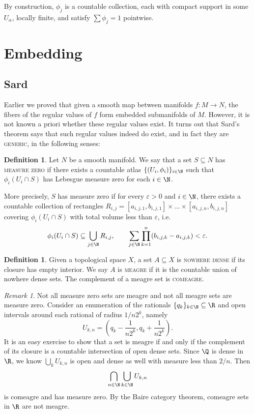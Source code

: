\documentclass[reqno]{amsart}
\theoremstyle{definition}
\newtheorem{definition}[theorem]{Definition}
\theoremstyle{remark}
\newtheorem*{remark}{Remark}
\renewcommand{\epsilon}{\varepsilon}
\renewcommand{\emph}{\textsc}
\begin{document}
	By construction, $\phi_j$ is a countable collection, each with compact support in some $U_\alpha$, locally finite, and satisfy $\sum \phi_j = 1$ pointwise. 	


\section{Embedding}

\subsection{Sard}

Earlier we proved that given a smooth map between manifolds $f: M \to N$, the fibers of the regular values of $f$ form embedded submanifolds of $M$. However, it is not known a priori whether these regular values exist. It turns out that Sard's theorem says that such regular values indeed do exist, and in fact they are \emph{generic}, in the following senses:

\begin{definition}
	Let $N$ be a smooth manifold. We say that a set $S \subseteq N$ has \emph{measure zero} if there exists a countable atlas $\{ (U_i, \phi_i) \}_{i \in \N}$ such that $\phi_i (U_i \cap S)$ has Lebesgue measure zero for each $i \in \N$. 
	
	More precisely, $S$ has measure zero if for every $\epsilon > 0$ and $i \in \N$, there exists a countable collection of rectangles $R_{i, j} = [a_{i, j, 1}, b_{i, j, 1}] \times \dots \times [a_{i, j, n}, b_{i, j, n}]$ covering $\phi_i (U_i \cap S)$ with total volume less than $\epsilon$, i.e.
		\[ \phi_i (U_i \cap S) \subseteq \bigcup_{j \in \N} R_{i, j}, \qquad \sum_{j \in \N} \prod_{k = 1}^n (b_{i, j, k} - a_{i, j, k}) < \epsilon. \]
\end{definition}

\begin{definition}
	Given a topological space $X$, a set $A \subseteq X$ is \emph{nowhere dense} if its closure has empty interior. We say $A$ is \emph{meagre} if it is the countable union of nowhere dense sets. The complement of a meagre set is \emph{comeagre}.
\end{definition}

\begin{remark}
	Not all measure zero sets are meagre and not all meagre sets are measure zero. Consider an enumeration of the rationals $\{q_k\}_{k \in \N} \subseteq \R$ and open intervals around each rational of radius $1/n2^k$, namely
		\[ U_{k, n} = \left( q_k - \frac{1}{n 2^k},  q_k + \frac{1}{n 2^k} \right). \]
	It is an easy exercise to show that a set is meagre if and only if the complement of its closure is a countable intersection of open dense sets. Since $\Q$ is dense in $\R$, we know $\bigcup_k U_{k, n}$ is open and dense as well with measure less than $2/n$. Then 
		\[ \bigcap_{n \in \N} \bigcup_{k \in \N} U_{k, n} \]
	is comeagre and has measure zero. By the Baire category theorem, comeagre sets in $\R$ are not meagre. 
\end{remark}
\end{document}
